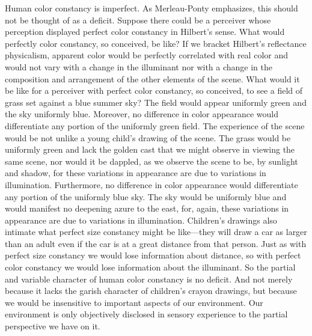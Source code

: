 Human color constancy is imperfect. As Merleau-Ponty emphasizes, this should not be thought of as a deficit. Suppose there could be a perceiver whose perception displayed perfect color constancy in Hilbert's sense. What would perfectly color constancy, so conceived, be like? If we bracket Hilbert's reflectance physicalism, apparent color would be perfectly correlated with real color and would not vary with a change in the illuminant nor with a change in the composition and arrangement of the other elements of the scene. What would it be like for a perceiver with perfect color constancy, so conceived, to see a field of grass set against a blue summer sky? The field would appear uniformly green and the sky uniformly blue. Moreover, no difference in color appearance would differentiate any portion of the uniformly green field. The experience of the scene would be not unlike a young child's drawing of the scene. The grass would be uniformly green and lack the golden cast that we might observe in viewing the same scene, nor would it be dappled, as we observe the scene to be, by sunlight and shadow, for these variations in appearance are due to variations in illumination. Furthermore, no difference in color appearance would differentiate any portion of the uniformly blue sky. The sky would be uniformly blue and would manifest no deepening azure to the east, for, again, these variations in appearance are due to variations in illumination. Children's drawings also intimate what perfect size constancy might be like---they will draw a car as larger than an adult even if the car is at a great distance from that person. Just as with perfect size constancy we would lose information about distance, so with perfect color constancy we would lose information about the illuminant. So the partial and variable character of human color constancy is no deficit. And not merely because it lacks the garish character of children's crayon drawings, but because we would be insensitive to important aspects of our environment. Our environment is only objectively disclosed in sensory experience to the partial perspective we have on it.

